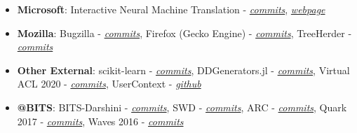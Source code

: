 
\begin{courses}
	\course
	{\begin{itemize}
	
	\item \textbf{Microsoft}: Interactive Neural Machine Translation -  \href{https://github.com/microsoft/inmt/commits?author=SebastinSanty}{\textit{commits}}, \href{https://microsoft.github.io/inmt/}{\textit{webpage}}
	
    \item \textbf{Mozilla}: Bugzilla - \href{https://github.com/mozilla-bteam/bmo/commits?author=sebastinsanty}{\textit{commits}}, Firefox (Gecko Engine) -  \href{https://github.com/mozilla/gecko-dev/commits?author=sebastinssanty}{\textit{commits}}, TreeHerder - \href{https://github.com/mozilla/treeherder/commits?author=sebastinsanty}{\textit{commits}}
    
    \item \textbf{Other External}: scikit-learn - \href{https://github.com/scikit-learn/scikit-learn/commits?author=sebastinsanty}{\textit{commits}}, DDGenerators.jl -  \href{https://github.com/oxinabox/DataDepsGenerators.jl/commits?author=sebastinsanty}{\textit{commits}}, Virtual ACL 2020 - \href{https://github.com/acl-org/acl-2020-virtual-conference/commits?author=sebastinsanty}{\textit{commits}}, UserContext - \href{https://github.com/usercontext}{\textit{github}}
    
    \item \textbf{@BITS}: BITS-Darshini - \href{https://github.com/prasadtalasila/BITS-Darshini/commits?author=sebastinsanty}{\textit{commits}}, SWD - \href{https://github.com/swd-bits-goa/swd_django/commits?author=sebastinsanty}{\textit{commits}}, ARC - \href{https://github.com/arc-bits-goa/portal/commits?author=SebastinSanty}{\textit{commits}}, Quark 2017 - \href{ https://github.com/OSDLabs/QuarkWebsite2017/commits?author=SebastinSanty}{\textit{commits}}, Waves 2016 - \href{https://github.com/OSDLabs/WavesWebsite2016/commits?author=SebastinSanty}{\textit{commits}}
    
     \end{itemize}}
\end{courses}
\vspace{-3mm}